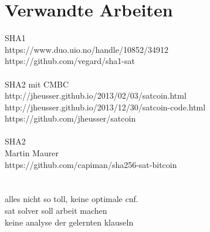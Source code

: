 \section{Verwandte Arbeiten}
\label{sec:otherwork}

SHA1\\
https://www.duo.uio.no/handle/10852/34912 \cite{vegard:1}\\
https://github.com/vegard/sha1-sat \cite{vegard:2}\\
~\\
SHA2 mit CMBC\\
http://jheusser.github.io/2013/02/03/satcoin.html \cite{jona:1}\\
http://jheusser.github.io/2013/12/30/satcoin-code.html \cite{jona:2}\\
https://github.com/jheusser/satcoin \cite{jona:3}\\
~\\
SHA2\\
Martin Maurer\\
https://github.com/capiman/sha256-sat-bitcoin \cite{capiman}\\
~\\
~\\
alles nicht so toll, keine optimale cnf.\\
sat solver soll arbeit machen\\
keine analyse der gelernten klauseln

